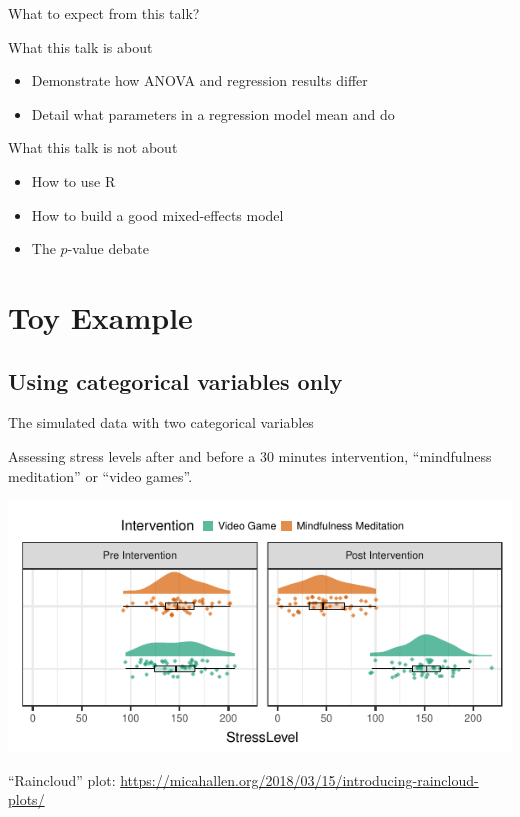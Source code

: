 \documentclass{beamer}
\begin{document}
\begin{frame}{What to expect from this talk?}

  \vfill
  \begin{block}{What this talk is about}
    \begin{itemize}
      \item Demonstrate how ANOVA and regression results differ
      \item Detail what parameters in a regression model mean and do
    \end{itemize}
  \end{block}
  \vfill
  \pause
  \begin{block}{What this talk is not about}
    \begin{itemize}
      \item How to use R
      \item How to build a good mixed-effects model
      \item The $p$-value debate
    \end{itemize}
  \end{block}
  \vfill

\end{frame}

\section{Toy Example}

\subsection{Using categorical variables only}

\begin{frame}{The simulated data with two categorical variables}
  
  \vfill
  Assessing stress levels after and before a 30 minutes intervention, ``mindfulness meditation'' or ``video games''.
  \vfill
  \pause
  \begin{center}
  \includegraphics{../src/CategoricalRaincloud.pdf}
  \end{center}
  \vfill
  \scriptsize{``Raincloud'' plot: \url{https://micahallen.org/2018/03/15/introducing-raincloud-plots/}}

\end{frame}
\end{document}
